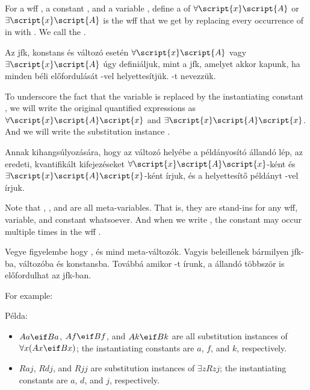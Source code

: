 

For a wff , a constant , and a variable , define a  of $\forall \script{x}\script{A}$ or $\exists \script{x}\script{A}$ is the wff that we get by replacing every occurrence of  in  with . We call  the .

Az  jfk,  konstans és  változó esetén $\forall \script{x}\script{A}$ vagy $\exists \script{x}\script{A}$   úgy definiáljuk, mint a jfk, amelyet akkor kapunk, ha  minden  béli előfordulását -vel helyettesítjük. -t  nevezzük.

To underscore the fact that the variable  is replaced by the instantiating constant , we will write the original quantified expressions as $\forall \script{x}\script{A}\script{x}$ and $\exists \script{x}\script{A}\script{x}$. And we will write the substitution instance .

Annak kihangsúlyozására, hogy az  változó helyébe a példányosító  állandó lép, az eredeti, kvantifikált kifejezéseket $\forall \script{x} \script{A} \script{x}$-ként és $\exists \script{x} \script{A} \script {x}$-ként írjuk, és a helyettesítő példányt -vel írjuk.

Note that , , and  are all meta-variables. That is, they are stand-ins for any wff, variable, and constant whatsoever. And when we write , the constant  may occur multiple times in the wff .

Vegye figyelembe hogy ,  és  mind meta-változók. Vagyis beleillenek bármilyen jfk-ba, változóba és konstansba. Továbbá amikor -t írunk, a  állandó többször is előfordulhat az  jfk-ban.


For example:

Példa:

\begin{itemize}
\item $Aa \eif Ba$, $Af \eif Bf$, and $Ak \eif Bk$ are all substitution instances of $\forall x(Ax \eif Bx)$; the instantiating constants are $a$, $f$, and $k$, respectively.
\item $Raj$, $Rdj$, and $Rjj$ are substitution instances of $\exists zRzj$; the instantiating constants are $a$, $d$, and $j$, respectively.
\end{itemize}

